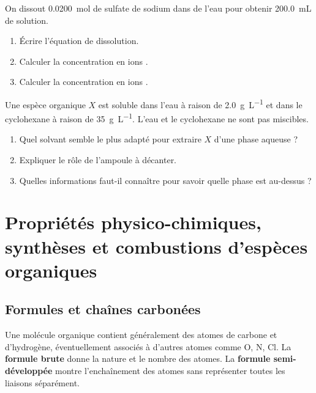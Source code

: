 \documentclass[11pt,a4paper]{article}
\begin{document}
\begin{exercicebox}[title=Exercice 7 - Dissolution ionique]
On dissout \SI{0.0200}{mol} de sulfate de sodium  dans de l'eau pour obtenir \SI{200.0}{mL} de solution.
\begin{enumerate}
\item Écrire l'équation de dissolution.
\item Calculer la concentration en ions .
\item Calculer la concentration en ions .
\end{enumerate}
\end{exercicebox}

\begin{exercicebox}[title=Exercice 8 - Extraction]
Une espèce organique $X$ est soluble dans l'eau à raison de \SI{2.0}{g.L^{-1}} et dans le cyclohexane à raison de \SI{35}{g.L^{-1}}. L'eau et le cyclohexane ne sont pas miscibles.
\begin{enumerate}
\item Quel solvant semble le plus adapté pour extraire $X$ d'une phase aqueuse ?
\item Expliquer le rôle de l'ampoule à décanter.
\item Quelles informations faut-il connaître pour savoir quelle phase est au-dessus ?
\end{enumerate}
\end{exercicebox}

\newpage

\section{Propriétés physico-chimiques, synthèses et combustions d'espèces organiques}

\subsection{Formules et chaînes carbonées}

\begin{definitionbox}
Une molécule organique contient généralement des atomes de carbone et d'hydrogène, éventuellement associés à d'autres atomes comme \ce O, \ce N, \ce Cl. La \textbf{formule brute} donne la nature et le nombre des atomes. La \textbf{formule semi-développée} montre l'enchaînement des atomes sans représenter toutes les liaisons  séparément.
\end{definitionbox}
\end{document}
